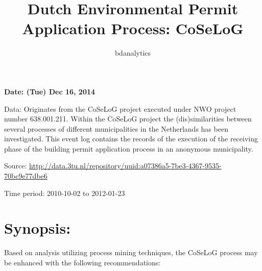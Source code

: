 \documentclass[]{article}
\title{Dutch Environmental Permit Application Process: CoSeLoG}
\author{bdanalytics}
\date{}
\begin{document}
\maketitle


{
\hypersetup{linkcolor=black}
\setcounter{tocdepth}{2}
\tableofcontents
}
\textbf{Date: (Tue) Dec 16, 2014}

Data: Originates from the CoSeLoG project executed under NWO project
number 638.001.211. Within the CoSeLoG project the (dis)similarities
between several processes of different municipalities in the Netherlands
has been investigated. This event log contains the records of the
execution of the receiving phase of the building permit application
process in an anonymous municipality.

Source:
\url{http://data.3tu.nl/repository/uuid:a07386a5-7be3-4367-9535-70bc9e77dbe6}

Time period: 2010-10-02 to 2012-01-23

\section{Synopsis:}\label{synopsis}

Based on analysis utilizing process mining techniques, the CoSeLoG
process may be enhanced with the following recommendations:
\end{document}
